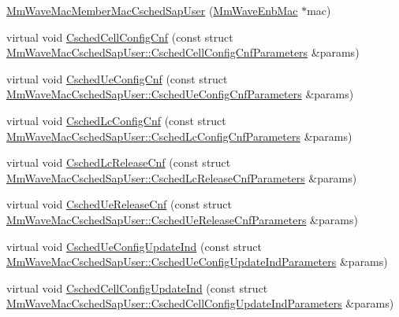 \begin{DoxyCompactItemize}
\item 
\hyperlink{classns3_1_1MmWaveMacMemberMacCschedSapUser_a7eb97eadd40476e488a2d357bd5e1de5}{Mm\+Wave\+Mac\+Member\+Mac\+Csched\+Sap\+User} (\hyperlink{classns3_1_1MmWaveEnbMac}{Mm\+Wave\+Enb\+Mac} $\ast$mac)
\item 
virtual void \hyperlink{classns3_1_1MmWaveMacMemberMacCschedSapUser_a3952e257cb0e6b4c68b580f0c0c7822e}{Csched\+Cell\+Config\+Cnf} (const struct \hyperlink{structns3_1_1MmWaveMacCschedSapUser_1_1CschedCellConfigCnfParameters}{Mm\+Wave\+Mac\+Csched\+Sap\+User\+::\+Csched\+Cell\+Config\+Cnf\+Parameters} \&params)
\item 
virtual void \hyperlink{classns3_1_1MmWaveMacMemberMacCschedSapUser_a77d2ed4b89f4dabac722984b982b651f}{Csched\+Ue\+Config\+Cnf} (const struct \hyperlink{structns3_1_1MmWaveMacCschedSapUser_1_1CschedUeConfigCnfParameters}{Mm\+Wave\+Mac\+Csched\+Sap\+User\+::\+Csched\+Ue\+Config\+Cnf\+Parameters} \&params)
\item 
virtual void \hyperlink{classns3_1_1MmWaveMacMemberMacCschedSapUser_aa10c7128a0b4dd9d06d126cf64eea644}{Csched\+Lc\+Config\+Cnf} (const struct \hyperlink{structns3_1_1MmWaveMacCschedSapUser_1_1CschedLcConfigCnfParameters}{Mm\+Wave\+Mac\+Csched\+Sap\+User\+::\+Csched\+Lc\+Config\+Cnf\+Parameters} \&params)
\item 
virtual void \hyperlink{classns3_1_1MmWaveMacMemberMacCschedSapUser_aae838fc3944b9977afadab8f86acfde8}{Csched\+Lc\+Release\+Cnf} (const struct \hyperlink{structns3_1_1MmWaveMacCschedSapUser_1_1CschedLcReleaseCnfParameters}{Mm\+Wave\+Mac\+Csched\+Sap\+User\+::\+Csched\+Lc\+Release\+Cnf\+Parameters} \&params)
\item 
virtual void \hyperlink{classns3_1_1MmWaveMacMemberMacCschedSapUser_ae147a3c39cfd620ad5d90cbeec92d602}{Csched\+Ue\+Release\+Cnf} (const struct \hyperlink{structns3_1_1MmWaveMacCschedSapUser_1_1CschedUeReleaseCnfParameters}{Mm\+Wave\+Mac\+Csched\+Sap\+User\+::\+Csched\+Ue\+Release\+Cnf\+Parameters} \&params)
\item 
virtual void \hyperlink{classns3_1_1MmWaveMacMemberMacCschedSapUser_a35b8ac894de6946ebc712306ac1a46e9}{Csched\+Ue\+Config\+Update\+Ind} (const struct \hyperlink{structns3_1_1MmWaveMacCschedSapUser_1_1CschedUeConfigUpdateIndParameters}{Mm\+Wave\+Mac\+Csched\+Sap\+User\+::\+Csched\+Ue\+Config\+Update\+Ind\+Parameters} \&params)
\item 
virtual void \hyperlink{classns3_1_1MmWaveMacMemberMacCschedSapUser_abba4663e362311a89538031956c887ef}{Csched\+Cell\+Config\+Update\+Ind} (const struct \hyperlink{structns3_1_1MmWaveMacCschedSapUser_1_1CschedCellConfigUpdateIndParameters}{Mm\+Wave\+Mac\+Csched\+Sap\+User\+::\+Csched\+Cell\+Config\+Update\+Ind\+Parameters} \&params)
\end{DoxyCompactItemize}
